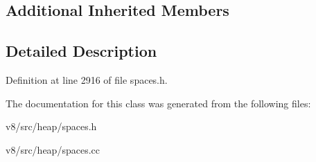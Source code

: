 \subsection*{Additional Inherited Members}


\subsection{Detailed Description}


Definition at line 2916 of file spaces.\+h.



The documentation for this class was generated from the following files\+:\begin{DoxyCompactItemize}
\item 
v8/src/heap/spaces.\+h\item 
v8/src/heap/spaces.\+cc\end{DoxyCompactItemize}
